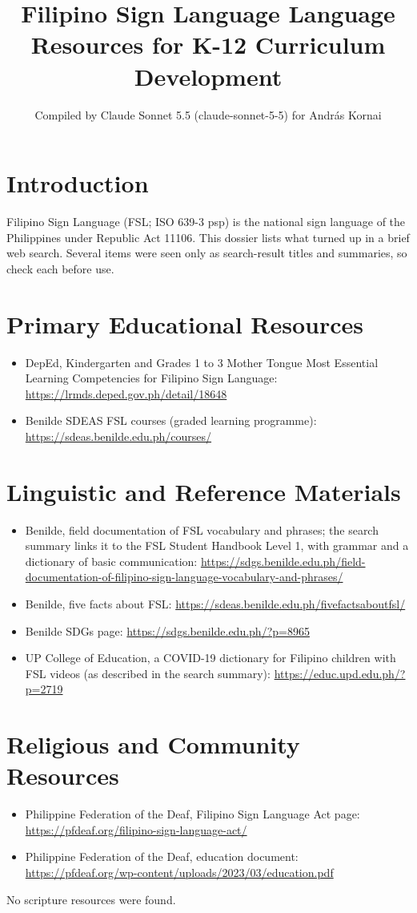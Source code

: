 \documentclass[12pt]{article}
\title{Filipino Sign Language Language Resources for K-12 Curriculum Development}
\author{Compiled by Claude Sonnet 5.5 (claude-sonnet-5-5) for Andr\'as Kornai}
\date{}
\begin{document}
\maketitle

\section{Introduction}
Filipino Sign Language (FSL; ISO 639-3 psp) is the national sign language of the Philippines under Republic Act 11106. This dossier lists what turned up in a brief web search. Several items were seen only as search-result titles and summaries, so check each before use.

\section{Primary Educational Resources}
\begin{itemize}
\item DepEd, Kindergarten and Grades 1 to 3 Mother Tongue Most Essential Learning Competencies for Filipino Sign Language: \url{https://lrmds.deped.gov.ph/detail/18648}
\item Benilde SDEAS FSL courses (graded learning programme): \url{https://sdeas.benilde.edu.ph/courses/}
\end{itemize}

\section{Linguistic and Reference Materials}
\begin{itemize}
\item Benilde, field documentation of FSL vocabulary and phrases; the search summary links it to the FSL Student Handbook Level 1, with grammar and a dictionary of basic communication: \url{https://sdgs.benilde.edu.ph/field-documentation-of-filipino-sign-language-vocabulary-and-phrases/}
\item Benilde, five facts about FSL: \url{https://sdeas.benilde.edu.ph/fivefactsaboutfsl/}
\item Benilde SDGs page: \url{https://sdgs.benilde.edu.ph/?p=8965}
\item UP College of Education, a COVID-19 dictionary for Filipino children with FSL videos (as described in the search summary): \url{https://educ.upd.edu.ph/?p=2719}
\end{itemize}

\section{Religious and Community Resources}
\begin{itemize}
\item Philippine Federation of the Deaf, Filipino Sign Language Act page: \url{https://pfdeaf.org/filipino-sign-language-act/}
\item Philippine Federation of the Deaf, education document: \url{https://pfdeaf.org/wp-content/uploads/2023/03/education.pdf}
\end{itemize}
No scripture resources were found.
\end{document}
